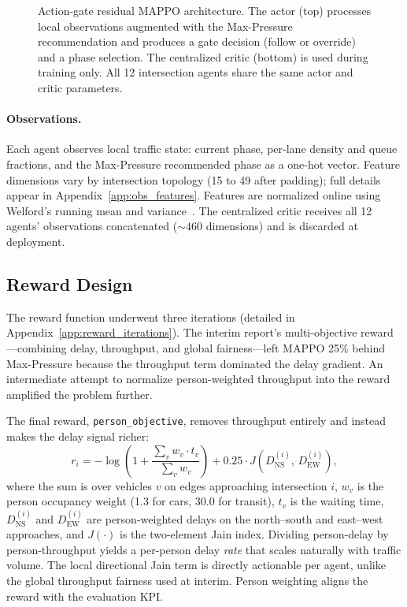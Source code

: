 \documentclass{article}
\begin{document}
\begin{figure}[t]
  \centering
  \resizebox{\columnwidth}{!}{}
  \caption{Action-gate residual MAPPO architecture. The actor (top) processes local observations augmented with the Max-Pressure recommendation and produces a gate decision (follow or override) and a phase selection. The centralized critic (bottom) is used during training only. All 12 intersection agents share the same actor and critic parameters.}
  \label{fig:architecture}
\end{figure}

\paragraph{Observations.} Each agent observes local traffic state: current phase, per-lane density and queue fractions, and the Max-Pressure recommended phase as a one-hot vector. Feature dimensions vary by intersection topology (15 to 49 after padding); full details appear in Appendix~\ref{app:obs_features}. Features are normalized online using Welford's running mean and variance~\cite{welford}. The centralized critic receives all 12 agents' observations concatenated (${\sim}460$ dimensions) and is discarded at deployment.


\subsection{Reward Design}
\label{sec:reward}

The reward function underwent three iterations (detailed in Appendix~\ref{app:reward_iterations}). The interim report's multi-objective reward---combining delay, throughput, and global fairness---left MAPPO 25\% behind Max-Pressure because the throughput term dominated the delay gradient. An intermediate attempt to normalize person-weighted throughput into the reward amplified the problem further.

The final reward, \texttt{person\_objective}, removes throughput entirely and instead makes the delay signal richer:
\begin{equation}
  r_i = -\log\!\left(1 + \frac{\sum_v w_v \cdot t_v}{\sum_v w_v}\right) + 0.25 \cdot J\!\left(D_{\mathrm{NS}}^{(i)},\, D_{\mathrm{EW}}^{(i)}\right),
  \label{eq:reward_person}
\end{equation}
where the sum is over vehicles $v$ on edges approaching intersection $i$, $w_v$ is the person occupancy weight (1.3 for cars, 30.0 for transit), $t_v$ is the waiting time, $D_{\mathrm{NS}}^{(i)}$ and $D_{\mathrm{EW}}^{(i)}$ are person-weighted delays on the north--south and east--west approaches, and $J(\cdot)$ is the two-element Jain index. Dividing person-delay by person-throughput yields a per-person delay \emph{rate} that scales naturally with traffic volume. The local directional Jain term is directly actionable per agent, unlike the global throughput fairness used at interim. Person weighting aligns the reward with the evaluation KPI.
\end{document}
